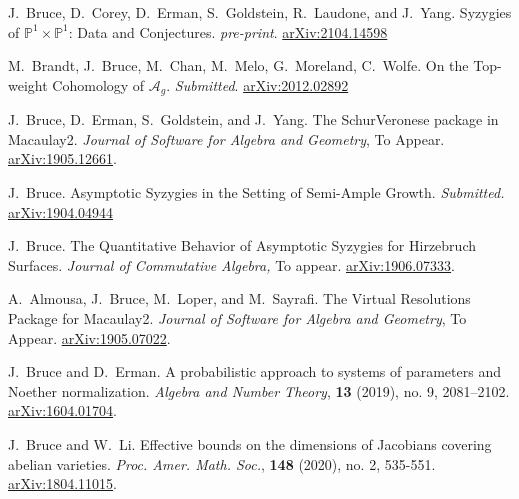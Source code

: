 \documentclass[letterpaper,11pt]{article}
\begin{document}
\begin{revnumerate}[12]
\item
	J.~Bruce, D.~Corey, D.~Erman, S.~Goldstein, R.~Laudone, and J.~Yang. Syzygies of $\mathbb{P}^{1}\times\mathbb{P}^{1}$: Data and Conjectures.  {\it pre-print}. \hyperref{https://arxiv.org/abs/2104.14598}{}{}{arXiv:2104.14598}
		\vspace{-.12in}
\item
	M.~Brandt, J.~Bruce, M.~Chan, M.~Melo, G.~Moreland, C.~Wolfe. On the Top-weight Cohomology of $\mathcal{A}_{g}$.  {\it Submitted}. \hyperref{https://arxiv.org/abs/2012.02892}{}{}{arXiv:2012.02892}
	\vspace{-.12in}
\item
	J.~Bruce, D.~Erman, S.~Goldstein, and J.~Yang. The SchurVeronese package in Macaulay2.  {\it Journal of Software for Algebra and Geometry}, To Appear. \hyperref{https://arxiv.org/abs/1905.12661}{}{}{arXiv:1905.12661}.
	\vspace{-.12in}
\item
	J.~Bruce. Asymptotic Syzygies in the Setting of Semi-Ample Growth. {\it Submitted.} \hyperref{https://arxiv.org/abs/1904.04944}{}{}{arXiv:1904.04944}
	\vspace{-.12in}
\item
	J.~Bruce. The Quantitative Behavior of Asymptotic Syzygies for Hirzebruch Surfaces. {\it Journal of Commutative Algebra,} To appear. \hyperref{http://arxiv.org/abs/1906.07333}{}{}{arXiv:1906.07333}.
	\vspace{-.12in}
\item
	A.~Almousa, J.~Bruce, M.~Loper, and M.~Sayrafi. The Virtual Resolutions Package for Macaulay2.  {\it Journal of Software for Algebra and Geometry}, To Appear. \hyperref{http://arxiv.org/abs/1905.07022}{}{}{arXiv:1905.07022}.
	\vspace{-.12in}
\item
	J.~Bruce and D.~Erman. A probabilistic approach to systems of parameters and Noether normalization. {\it Algebra and Number Theory}, \textbf{13} (2019), no. 9, 2081–2102. \hyperref{http://arxiv.org/abs/1604.01704}{}{}{arXiv:1604.01704}.
	\vspace{-.12in}
\item
	J.~Bruce and W.~Li. Effective bounds on the dimensions of Jacobians covering abelian varieties.  {\it Proc. Amer. Math. Soc.}, \textbf{148} (2020), no. 2, 535-551. \hyperref{https://arxiv.org/abs/1804.11015}{}{}{arXiv:1804.11015}.

\end{revnumerate}
\end{document}
